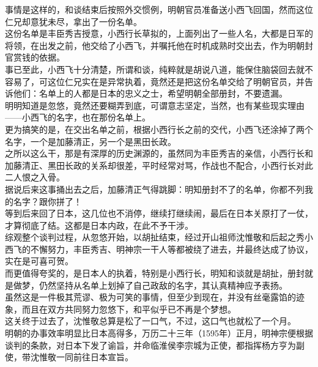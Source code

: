 \begin{multicols}{\theparacolNo}
事情是这样的，和谈结束后按照外交惯例，明朝官员准备送小西飞回国，然而这位仁兄却意犹未尽，拿出了一份名单。\\

这份名单是丰臣秀吉授意，小西行长草拟的，上面列出了一些人名，大都是日军的将领，在出发之前，他交给了小西飞，并嘱托他在时机成熟时交出去，作为明朝封官赏钱的依据。\\

事已至此，小西飞十分清楚，所谓和谈，纯粹就是胡说八道，能保住脑袋回去就不容易了，可这位仁兄实在是异常执着，竟然还是把这份名单交给了明朝官员，并告诉他们：名单上的人都是日本的忠义之士，希望明朝全部册封，不要遗漏。\\

明明知道是忽悠，竟然还要糊弄到底，可谓意志坚定，当然，也有某些现实理由——小西飞的名字，也在那份名单上。\\

更为搞笑的是，在交出名单之前，根据小西行长之前的交代，小西飞还涂掉了两个名字，一个是加藤清正，另一个是黑田长政。\\

之所以这么干，那是有深厚的历史渊源的，虽然同为丰臣秀吉的亲信，小西行长和加藤清正、黑田长政的关系却很差，平时经常对骂，作战也不配合，小西行长对此二人恨之入骨。\\

据说后来这事捅出去之后，加藤清正气得跳脚：明知册封不了的名单，你都不列我的名字？跟你拼了！\\

等到后来回了日本，这几位也不消停，继续打继续闹，最后在日本关原打了一仗，才算彻底了结。这都是日本内政，在此不予干涉。\\

综观整个谈判过程，从忽悠开始，以胡扯结束，经过开山祖师沈惟敬和后起之秀小西飞的不懈努力，丰臣秀吉、明神宗一干人等都被绕了进去，并最终达成了协议，实在是可喜可贺。\\

而更值得夸奖的，是日本人的执着，特别是小西行长，明知和谈就是胡扯，册封就是做梦，仍然坚持从名单上划掉了自己政敌的名字，其认真精神应予表扬。\\

虽然这是一件极其荒谬、极为可笑的事情，但至少到现在，并没有丝毫露馅的迹象，而且在双方共同努力忽悠下，和平似乎已不再是个梦想。\\

这关终于过去了，沈惟敬总算是松了一口气，不过，这口气也就松了一个月。\\

明朝的办事效率明显比日本高得多，万历二十三年（1595年）正月，明神宗便根据谈判的条款，对日本下发了谕旨，并命临淮侯李宗城为正使，都指挥杨方亨为副使，带沈惟敬一同前往日本宣旨。\\


\end{multicols}
